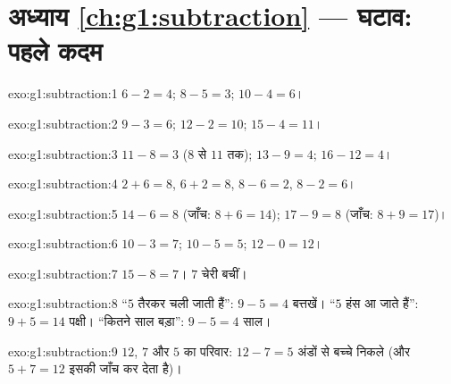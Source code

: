 \section*{अध्याय \ref{ch:g1:subtraction} --- घटाव: पहले कदम}

\begin{solution}{exo:g1:subtraction:1}
$6 - 2 = 4$; \quad $8 - 5 = 3$; \quad $10 - 4 = 6$।
\end{solution}

\begin{solution}{exo:g1:subtraction:2}
$9 - 3 = 6$; \quad $12 - 2 = 10$; \quad $15 - 4 = 11$।
\end{solution}

\begin{solution}{exo:g1:subtraction:3}
$11 - 8 = 3$ ($8$ से $11$ तक); \quad
$13 - 9 = 4$; \quad $16 - 12 = 4$।
\end{solution}

\begin{solution}{exo:g1:subtraction:4}
$2 + 6 = 8$, \quad $6 + 2 = 8$, \quad $8 - 6 = 2$, \quad
$8 - 2 = 6$।
\end{solution}

\begin{solution}{exo:g1:subtraction:5}
$14 - 6 = 8$ (जाँच: $8 + 6 = 14$); \quad
$17 - 9 = 8$ (जाँच: $8 + 9 = 17$)।
\end{solution}

\begin{solution}{exo:g1:subtraction:6}
$10 - 3 = 7$; \quad $10 - 5 = 5$; \quad $12 - 0 = 12$।
\end{solution}

\begin{solution}{exo:g1:subtraction:7}
$15 - 8 = 7$। $7$ चेरी बचीं।
\end{solution}

\begin{solution}{exo:g1:subtraction:8}
``$5$ तैरकर चली जाती हैं'': $9 - 5 = 4$ बत्तखें। ``$5$ हंस आ जाते हैं'':
$9 + 5 = 14$ पक्षी। ``कितने साल बड़ा'': $9 - 5 = 4$ साल।
\end{solution}

\begin{solution}{exo:g1:subtraction:9}
$12$, $7$ और $5$ का परिवार: $12 - 7 = 5$ अंडों से बच्चे निकले (और
$5 + 7 = 12$ इसकी जाँच कर देता है)।

\end{solution}
